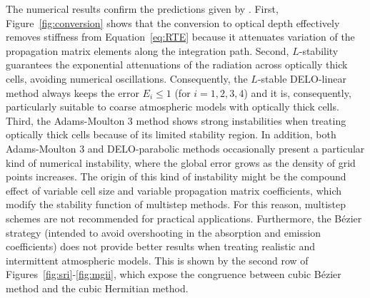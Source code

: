 \documentclass[iop,numberedappendix,twocolappendix,twocolumn]{emulateapj}
\begin{document}
The numerical results confirm the predictions given by \citet{janett2018a}.
First, Figure~\ref{fig:conversion} shows that the conversion to optical depth effectively removes stiffness from Equation~\eqref{eq:RTE}
because it attenuates variation of the propagation matrix elements along the integration path.
Second, $L$-stability guarantees the exponential attenuations of the radiation across optically thick cells, avoiding numerical oscillations.
Consequently, the $L$-stable DELO-linear method always keeps the error $E_i\le1$ (for $i=1,2,3,4$)
and it is, consequently, particularly suitable to coarse atmospheric models with optically thick cells.
Third, the Adams-Moulton 3 method shows strong instabilities when treating optically thick cells because of its limited stability region.
In addition, both Adams-Moulton 3 and DELO-parabolic methods occasionally present
a particular kind of numerical instability, where
the global error grows as the density of grid points increases.
The origin of this kind of instability might be the compound effect of variable cell size and variable propagation matrix coefficients,
which modify the stability function of multistep methods.
For this reason, multistep schemes are not recommended for practical applications.
Furthermore, the B\'ezier strategy (intended to avoid overshooting in the absorption and emission coefficients) does not provide better results when treating realistic and intermittent atmospheric models. This is shown by the second row of Figures~\ref{fig:sri}-\ref{fig:mgii}, 
which expose the congruence between cubic B\'ezier method and the cubic Hermitian method.

\end{document}
